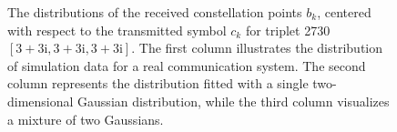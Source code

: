 \begin{figure}[hp]
\begin{minipage}[h]{0.33\linewidth}
{    }
    \end{minipage}
    \begin{minipage}[h]{0.33\linewidth}
    \end{minipage}
    \caption{The distributions of the received constellation points \( b_k \), centered with respect to the transmitted symbol \( c_k \) for triplet 2730 $[3+3\mathrm{i}, 3+3\mathrm{i}, 3+3\mathrm{i}]$. The first column illustrates the distribution of simulation data for a real communication system. The second column represents the distribution fitted with a single two-dimensional Gaussian distribution, while the third column visualizes a mixture of two Gaussians.}
    \label{fig:gauss_triplet_2730_compare_2d}
\end{figure}
